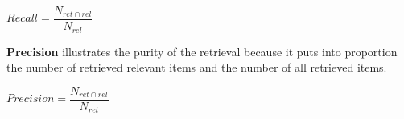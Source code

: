\begin{centering}
	\vspace{1cm}
	
	$Recall=\dfrac{N_{ret\cap rel}}{ N_{rel} }  $
	
	\vspace{1cm}
\end{centering} 

\noindent
\textbf{Precision} illustrates the purity of the retrieval because it puts into proportion the number of retrieved relevant items and the number of all retrieved items.

\begin{centering}
	\vspace{1cm}
	
	$Precision=\dfrac{N_{ret\cap rel}}{ N_{ret} }  $
	
	\vspace{1cm}
\end{centering} 

